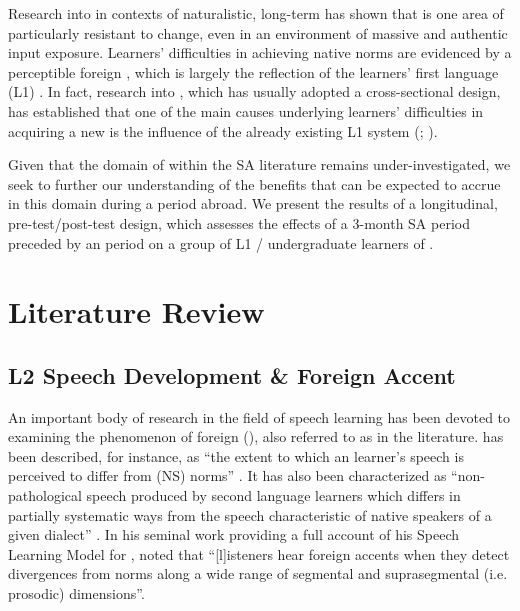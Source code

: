 \documentclass[output=paper]{langsci/langscibook}
\begin{document}
Research into    in contexts of naturalistic, long-term  has shown that  is one area of   particularly resistant to change, even in an environment of massive and authentic  input exposure. Learners’ difficulties in achieving native  norms are evidenced by a perceptible foreign , which is largely the reflection of the learners’ first language (L1) . In fact, research into   , which has usually adopted a cross-sectional design, has established that one of the main causes underlying learners’ difficulties in acquiring a new   is the influence of the already existing L1  system (\citealt{Flege1995}; \citealt{BestTyler2007}).

Given that the domain of   within the SA literature remains under-investigated, we seek to further our understanding of the benefits that can be expected to accrue in this domain during a period abroad. We present the results of a longitudinal, pre-test/post-test design, which assesses the effects of a 3-month SA period preceded by an  period on a group of L1 / undergraduate learners of  .


\section{Literature Review}


\subsection{L2 Speech Development \& Foreign Accent}


An important body of research in the field of  speech learning has been devoted to examining the phenomenon of foreign  (), also referred to as  in the literature.  has been described, for instance, as “the extent to which an  learner’s speech is perceived to differ from  (NS) norms” \citep[160]{MunroDerwing1998}. It has also been characterized as “non-pathological speech produced by second language learners which differs in partially systematic ways from the speech characteristic of native speakers of a given dialect” \citep[139]{Munro1998}. In his seminal work providing a full account of his Speech Learning Model for   , \citet[233]{Flege1995} noted that “[l]isteners hear foreign accents when they detect divergences from   norms along a wide range of segmental and suprasegmental (i.e. prosodic) dimensions”. 
\end{document}
